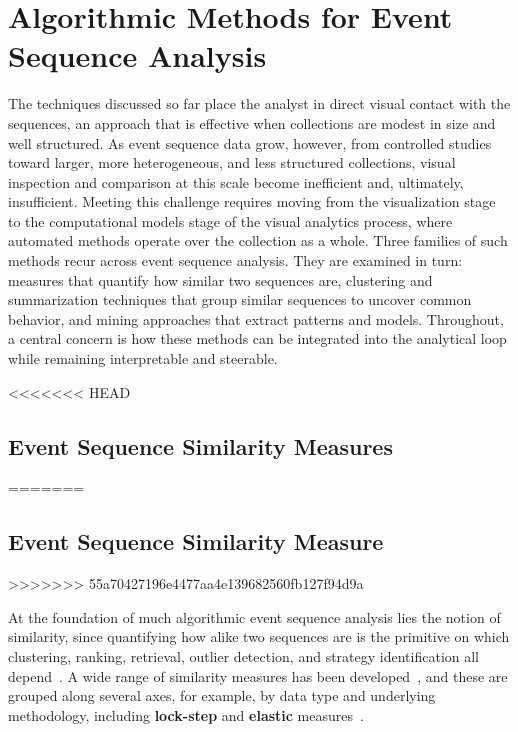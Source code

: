 \section{Algorithmic Methods for Event Sequence Analysis}

The techniques discussed so far place the analyst in direct visual contact with the sequences, an approach that is effective when collections are modest in size and well structured.
As event sequence data grow, however, from controlled studies toward larger, more heterogeneous, and less structured collections, visual inspection and comparison at this scale become inefficient and, ultimately, insufficient.
Meeting this challenge requires moving from the visualization stage to the computational models stage of the visual analytics process, where automated methods operate over the collection as a whole. 
Three families of such methods recur across event sequence analysis.
They are examined in turn: measures that quantify how similar two sequences are, clustering and summarization techniques that group similar sequences to uncover common behavior, and mining approaches that extract patterns and models.
Throughout, a central concern is how these methods can be integrated into the analytical loop while remaining interpretable and steerable. 


<<<<<<< HEAD
\subsection{Event Sequence Similarity Measures}
=======
\subsection{Event Sequence Similarity Measure}
>>>>>>> 55a70427196e4477aa4e139682560fb127f94d9a

At the foundation of much algorithmic event sequence analysis lies the notion of similarity, since quantifying how alike two sequences are is the primitive on which clustering, ranking, retrieval, outlier detection, and strategy identification all depend~\cite{linden2023survey}.
A wide range of similarity measures has been developed~\cite{mantaci2008distance, studer2016what}, and these are grouped along several axes, for example, by data type and underlying methodology, including \textbf{lock-step} and \textbf{elastic} measures~\cite{ding2008querying, saeed2006novel, aghabozorgi2015time}.

